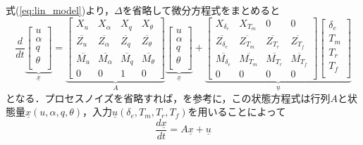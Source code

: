 式(\ref{eq:lin_model})より，$\Delta$を省略して微分方程式をまとめると
\begin{equation}
  \dfrac{d}{dt}
  \underbrace{
  \left[
  \begin{array}{cccc}
    u \\
    \alpha \\
    q \\
    \theta \\
  \end{array}
  \right]}_{\underline{x}} =
  \underbrace{
  \left[
  \begin{array}{cccc}
    X_u & X_\alpha & X_q & X_\theta \\
    \overline{Z_u} & \overline{Z_\alpha} & \overline{Z_q} & \overline{Z_\theta} \\
    \overline{M_u} & \overline{M_\alpha} & \overline{M_q} & \overline{M_\theta} \\
    0 & 0 & 1 & 0
  \end{array}
  \right]}_{A}
  \underbrace{
  \left[
  \begin{array}{cccc}
    u \\
    \alpha \\
    q \\
    \theta \\
  \end{array}
  \right]}_{\underline{x}} +
  \underbrace{
  \left[
  \begin{array}{cccc}
    X_{\delta_e} & X_{T_m} & 0 & 0 \\
    \overline{Z_{\delta_e}} & \overline{Z_{T_m}} & \overline{Z_{T_r}} & \overline{Z_{T_f}} \\
    \overline{M_{\delta_e}} & \overline{M_{T_m}} & \overline{M_{T_r}} & \overline{M_{T_f}} \\
    0 & 0 & 0 & 0
  \end{array}
  \right]
  \left[
  \begin{array}{cccc}
    \delta_e \\
    T_m \\
    T_r \\
    T_f \\
  \end{array}
  \right]}_{\underline{u}}
\end{equation}
となる．プロセスノイズを省略すれば，\cite{}を参考に，この状態方程式は行列$A$と状態量$\underline{x}(u,\alpha,q,\theta)$，入力$\underline{u}(\delta_e,T_m,T_r,T_f)$を用いることによって
\begin{equation}
  \dfrac{d\underline{x}}{dt} = A\underline{x} + \underline{u}
\label{eq:matrix_A}
\end{equation}
